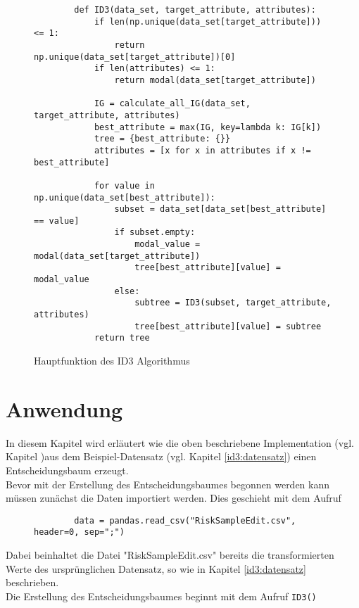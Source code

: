 \begin{figure}[htbp]
    \begin{verbatim}
        def ID3(data_set, target_attribute, attributes):
            if len(np.unique(data_set[target_attribute])) <= 1:
                return np.unique(data_set[target_attribute])[0]
            if len(attributes) <= 1:       
                return modal(data_set[target_attribute])

            IG = calculate_all_IG(data_set, target_attribute, attributes)
            best_attribute = max(IG, key=lambda k: IG[k])
            tree = {best_attribute: {}}
            attributes = [x for x in attributes if x != best_attribute]

            for value in np.unique(data_set[best_attribute]):
                subset = data_set[data_set[best_attribute] == value]
                if subset.empty:
                    modal_value = modal(data_set[target_attribute])
                    tree[best_attribute][value] = modal_value
                else:
                    subtree = ID3(subset, target_attribute, attributes)
                    tree[best_attribute][value] = subtree
            return tree
    \end{verbatim}
    \caption{Hauptfunktion des ID3 Algorithmus \autocites{MaxKeyByValue:online}{ID3algor15:online}{PythonCourseDecisionTrees:online}}
\end{figure}


\section{Anwendung}
\label{id3:anwendung}
In diesem Kapitel wird erläutert wie die oben beschriebene Implementation (vgl. Kapitel )aus dem Beispiel-Datensatz (vgl. Kapitel \ref{id3:datensatz}) einen Entscheidungsbaum erzeugt.\\
Bevor mit der Erstellung des Entscheidungsbaumes begonnen werden kann müssen zunächst die Daten importiert werden. Dies geschieht mit dem Aufruf 

\begin{figure}
    \begin{verbatim}
        data = pandas.read_csv("RiskSampleEdit.csv", header=0, sep=";")
    \end{verbatim}
\end{figure}
Dabei beinhaltet die Datei "RiskSampleEdit.csv" bereits die transformierten Werte des ursprünglichen Datensatz, so wie in Kapitel \ref{id3:datensatz} beschrieben.\\
Die Erstellung des Entscheidungsbaumes beginnt mit dem Aufruf \texttt{ID3()}